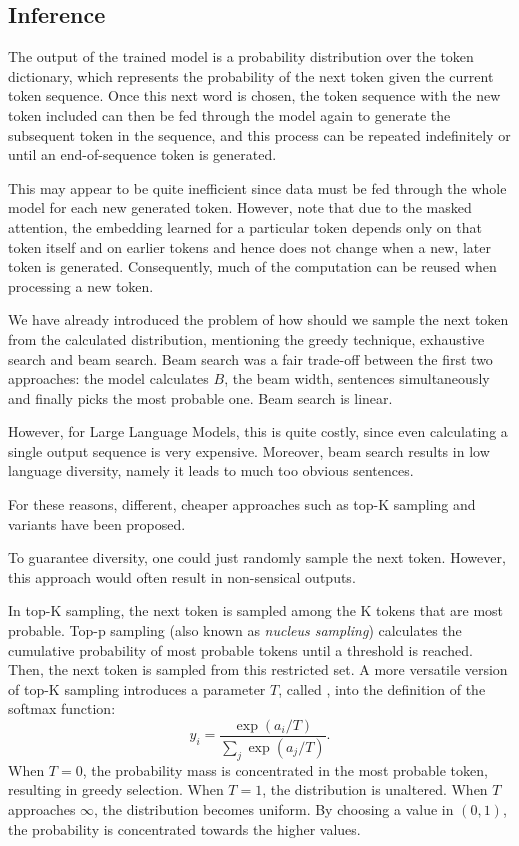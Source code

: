 \subsection{Inference}
The output of the trained model is a probability distribution over the token dictionary, which represents the probability of the next token given the current token sequence. 
Once this next word is chosen, the token sequence with the new token included can then be fed through the model again to generate the subsequent token in the sequence, and this process can be repeated indefinitely or until an end-of-sequence token is generated. 

This may appear to be quite inefficient since data must be fed through the whole model for each new generated token. 
However, note that due to the masked attention, the embedding learned for a particular token depends only on that token itself and on earlier tokens and hence does not change when a new, later token is generated. 
Consequently, much of the computation can be reused when processing a new token.

We have already introduced the problem of how should we sample the next token from the calculated distribution, mentioning the greedy technique, exhaustive search and beam search.
Beam search was a fair trade-off between the first two approaches: the model calculates \(B\), the beam width, sentences simultaneously and finally picks the most probable one.
Beam search is linear.

However, for Large Language Models, this is quite costly, since even calculating a single output sequence is very expensive.
Moreover, beam search results in low language diversity, namely it leads to much too obvious sentences.

For these reasons, different, cheaper approaches such as top-K sampling and variants have been proposed.

\begin{note}{}
    To guarantee diversity, one could just randomly sample the next token.
    However, this approach would often result in non-sensical outputs.
\end{note}

In top-K sampling, the next token is sampled among the K tokens that are most probable.
Top-p sampling (also known as \emph{nucleus sampling}) calculates the cumulative probability of most probable tokens until a threshold is reached. Then, the next token is sampled from this restricted set.
A more versatile version of top-K sampling introduces a parameter \(T\), called , into the definition of the softmax function:
\[
y_i = \frac{\exp(a_i / T)}{\sum_{j}\exp(a_j / T)}.
\]
When \(T=0\), the probability mass is concentrated in the most probable token, resulting in greedy selection.
When \(T=1\), the distribution is unaltered.
When \(T\) approaches \(\infty\), the distribution becomes uniform.
By choosing a value in \((0,1)\), the probability is concentrated towards the higher values.

